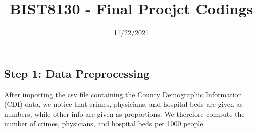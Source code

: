 \documentclass[
  11pt,
]{article}
\title{BIST8130 - Final Proejct Codings}
\author{}
\date{\vspace{-2.5em}11/22/2021}
\newenvironment{Shaded}{\begin{snugshade}}{\end{snugshade}}
\newcommand{\AttributeTok}[1]{\textcolor[rgb]{0.77,0.63,0.00}{#1}}
\newcommand{\ConstantTok}[1]{\textcolor[rgb]{0.00,0.00,0.00}{#1}}
\newcommand{\DecValTok}[1]{\textcolor[rgb]{0.00,0.00,0.81}{#1}}
\newcommand{\FunctionTok}[1]{\textcolor[rgb]{0.00,0.00,0.00}{#1}}
\newcommand{\NormalTok}[1]{#1}
\newcommand{\SpecialCharTok}[1]{\textcolor[rgb]{0.00,0.00,0.00}{#1}}
\newcommand{\StringTok}[1]{\textcolor[rgb]{0.31,0.60,0.02}{#1}}
\begin{document}
\maketitle

\begin{Shaded}
\end{Shaded}

\hypertarget{step-1-data-preprocessing}{%
\subsection{Step 1: Data
Preprocessing}\label{step-1-data-preprocessing}}

After importing the csv file containing the County Demographic
Information (CDI) data, we notice that crimes, physicians, and hospital
beds are given as numbers, while other info are given as proportions. We
therefore compute the number of crimes, physicians, and hospital beds
per 1000 people.
\end{document}
